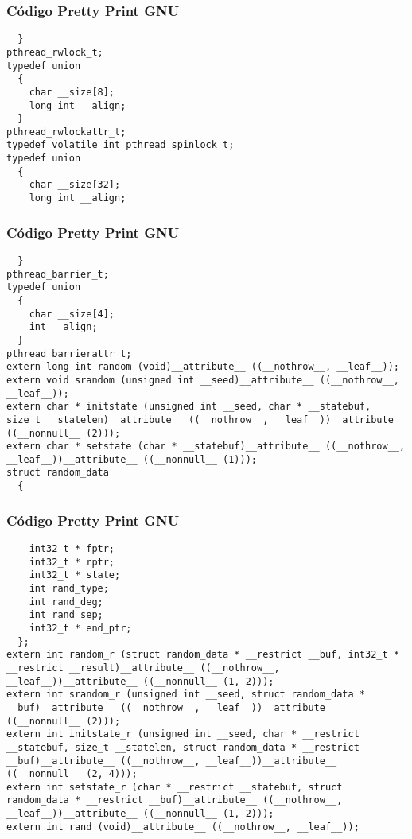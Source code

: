 \documentclass{beamer}
\begin{document}
\begin{frame}[fragile]
\frametitle{C\'odigo Pretty Print GNU}
\begin{verbatim}
  }
pthread_rwlock_t;
typedef union
  {
    char __size[8];
    long int __align;
  }
pthread_rwlockattr_t;
typedef volatile int pthread_spinlock_t;
typedef union
  {
    char __size[32];
    long int __align;
\end{verbatim}
\end{frame}
\begin{frame}[fragile]
\frametitle{C\'odigo Pretty Print GNU}
\begin{verbatim}
  }
pthread_barrier_t;
typedef union
  {
    char __size[4];
    int __align;
  }
pthread_barrierattr_t;
extern long int random (void)__attribute__ ((__nothrow__, __leaf__));
extern void srandom (unsigned int __seed)__attribute__ ((__nothrow__, __leaf__));
extern char * initstate (unsigned int __seed, char * __statebuf, size_t __statelen)__attribute__ ((__nothrow__, __leaf__))__attribute__ ((__nonnull__ (2)));
extern char * setstate (char * __statebuf)__attribute__ ((__nothrow__, __leaf__))__attribute__ ((__nonnull__ (1)));
struct random_data
  {
    \end{verbatim}
\end{frame}
\begin{frame}[fragile]
\frametitle{C\'odigo Pretty Print GNU}
\begin{verbatim}
    int32_t * fptr;
    int32_t * rptr;
    int32_t * state;
    int rand_type;
    int rand_deg;
    int rand_sep;
    int32_t * end_ptr;
  };
extern int random_r (struct random_data * __restrict __buf, int32_t * __restrict __result)__attribute__ ((__nothrow__, __leaf__))__attribute__ ((__nonnull__ (1, 2)));
extern int srandom_r (unsigned int __seed, struct random_data * __buf)__attribute__ ((__nothrow__, __leaf__))__attribute__ ((__nonnull__ (2)));
extern int initstate_r (unsigned int __seed, char * __restrict __statebuf, size_t __statelen, struct random_data * __restrict __buf)__attribute__ ((__nothrow__, __leaf__))__attribute__ ((__nonnull__ (2, 4)));
extern int setstate_r (char * __restrict __statebuf, struct random_data * __restrict __buf)__attribute__ ((__nothrow__, __leaf__))__attribute__ ((__nonnull__ (1, 2)));
extern int rand (void)__attribute__ ((__nothrow__, __leaf__));
\end{verbatim}
\end{frame}
\end{document}
